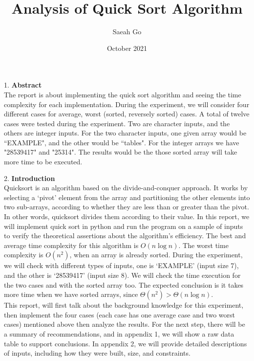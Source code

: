 \documentclass{article}
\title{\textbf{Analysis of Quick Sort Algorithm}}
\author{Saeah Go}
\date{October 2021}
\begin{document}
\maketitle

1. \textbf{Abstract} \\
\indent The report is about implementing the quick sort algorithm and seeing the time complexity for each implementation. During the experiment, we will consider four different cases for average, worst (sorted, reversely sorted) cases. A total of twelve cases were tested during the experiment. Two are character inputs, and the others are integer inputs. For the two character inputs, one given array would be ``EXAMPLE", and the other would be ``tables". For the integer arrays we have "28539417" and "25314". The results would be the those sorted array will take more time to be executed.

2. \textbf{Introduction} \\
\indent Quicksort is an algorithm based on the divide-and-conquer approach. It works by selecting a ‘pivot’ element from the array and partitioning the other elements into two sub-arrays, according to whether they are less than or greater than the pivot. In other words, quicksort divides them according to their value. In this report, we will implement quick sort in python and run the program on a sample of inputs to verify the theoretical assertions about the algorithm’s efficiency. The best and average time complexity for this algorithm is $O(n\log n)$. The worst time complexity is $O(n^2)$, when an array is already sorted. During the experiment, we will check with different types of inputs, one is ‘EXAMPLE’ (input size 7), and the other is ‘28539417’ (input size 8). We will check the time execution for the two cases and with the sorted array too. The expected conclusion is it takes more time when we have sorted arrays, since $\Theta(n^2) > \Theta(n\log n)$. \\
This report, will first talk about the background knowledge for this experiment, then implement the four cases (each case has one average case and two worst cases) mentioned above then analyze the results. For the next step, there will be a summary of recommendations, and in appendix 1, we will show a raw data table to support conclusions. In appendix 2, we will provide detailed descriptions of inputs, including how they were built, size, and constraints. \\
\end{document}
